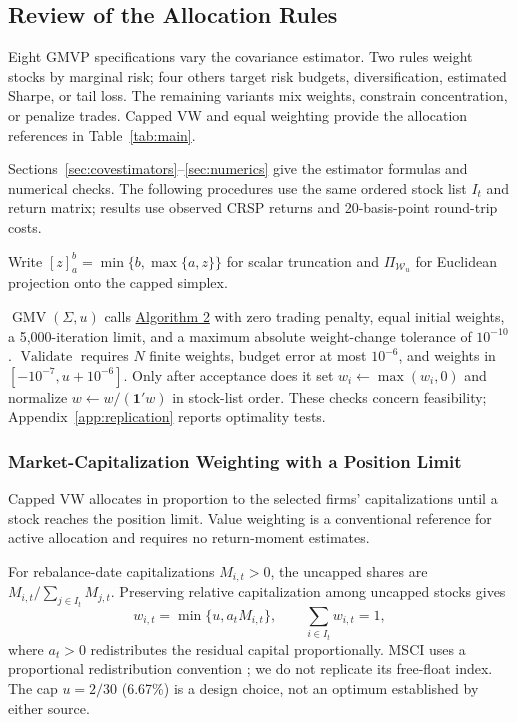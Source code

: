\documentclass[letterpaper,journal]{IEEEtran}
\begin{document}
\subsection{Review of the Allocation Rules}\label{sec:allocationreview}
Eight GMVP specifications vary the covariance estimator. Two rules weight stocks by marginal risk; four others target risk budgets, diversification, estimated Sharpe, or tail loss. The remaining variants mix weights, constrain concentration, or penalize trades. Capped VW and equal weighting provide the allocation references in Table~\ref{tab:main}.

Sections~\ref{sec:covestimators}--\ref{sec:numerics} give the estimator formulas and numerical checks. The following procedures use the same ordered stock list $I_t$ and return matrix; results use observed CRSP returns and 20-basis-point round-trip costs.

Write $[z]_a^b=\min\{b,\max\{a,z\}\}$ for scalar truncation and $\Pi_{\mathcal W_u}$ for Euclidean projection onto the capped simplex.

$\operatorname{GMV}(\Sigma,u)$ calls \hyperref[alg:prox]{Algorithm 2} with zero trading penalty, equal initial weights, a 5,000-iteration limit, and a maximum absolute weight-change tolerance of $10^{-10}$. $\operatorname{Validate}$ requires $N$ finite weights, budget error at most $10^{-6}$, and weights in $[-10^{-7},u+10^{-6}]$. Only after acceptance does it set $w_i\leftarrow\max(w_i,0)$ and normalize $w\leftarrow w/(\mathbf1'w)$ in stock-list order. These checks concern feasibility; Appendix~\ref{app:replication} reports optimality tests.

\subsubsection{Market-Capitalization Weighting with a Position Limit}\label{alloc:source_weight}
Capped VW allocates in proportion to the selected firms' capitalizations until a stock reaches the position limit. Value weighting is a conventional reference for active allocation \cite{brandtppp} and requires no return-moment estimates.

For rebalance-date capitalizations $M_{i,t}>0$, the uncapped shares are $M_{i,t}/\sum_{j\in I_t}M_{j,t}$. Preserving relative capitalization among uncapped stocks gives
\begin{equation}\label{eq:marketcap}
 w_{i,t}=\min\{u,a_t M_{i,t}\},\qquad
 \sum_{i\in I_t} w_{i,t}=1,
\end{equation}
where $a_t>0$ redistributes the residual capital proportionally. MSCI uses a proportional redistribution convention \cite{mscicap}; we do not replicate its free-float index. The cap $u=2/30$ (6.67\%) is a design choice, not an optimum established by either source.
\end{document}
